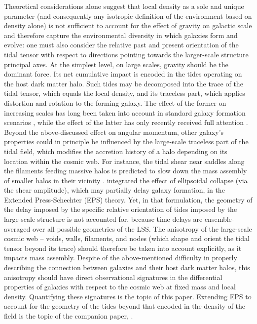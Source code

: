 \documentclass[useAMS,usenatbib]{mnras}
\begin{document}
Theoretical considerations alone suggest that local density as a sole and unique parameter (and consequently any isotropic definition of the environment based on density alone) is not sufficient to account for the effect of gravity on galactic scale \citep[e.g.][]{Mo2010} and therefore capture the environmental diversity in which galaxies form and evolve:
one must also consider the relative past and present orientation of the tidal tensor with respect to directions pointing towards the  larger-scale structure principal axes.
At the simplest level, on large scales, gravity should be the dominant force.  Its net cumulative impact is encoded in the  tides operating on the host dark matter halo. Such tides may be decomposed into the trace of the tidal tensor, which equals the local density, and its traceless part, which applies distortion and rotation to the forming galaxy. The effect of the former on increasing scales has long been taken into account in standard galaxy formation scenarios \citep{Kaiser1984}, while the effect of the latter has only recently received full attention \citep[e.g.][]{Codis2015}. 
Beyond the above-discussed effect on  angular momentum, other galaxy's properties could in principle be influenced by the large-scale traceless part of the tidal field, which modifies the accretion history of a halo depending on its location within the cosmic web. For instance, the tidal shear near saddles along the filaments feeding massive halos is predicted to slow down the mass assembly of smaller halos in their vicinity \citep[][]{Hahn2009,Borzyszkowski2016,2016arXiv161103619C}.
 \cite{BondMyers1996} integrated the effect of ellipsoidal collapse (via the shear amplitude), which may partially delay galaxy formation, in the Extended Press-Schechter (EPS) theory. Yet, in that formulation, the geometry of the delay imposed by the specific relative orientation of tides imposed by the large-scale structure is not accounted for, because time delays are ensemble-averaged over all possible geometries of the LSS. 
The  anisotropy of the large-scale cosmic web -- voids, walls, filaments, and nodes  (which shape  and orient the tidal tensor beyond its trace)
should therefore be taken into account explicitly, as it impacts mass assembly.
Despite of the above-mentioned difficulty in properly describing the connection between galaxies and their host dark matter halos, this anisotropy should have direct observational signatures in the differential properties of galaxies with respect to the cosmic web at fixed mass and local density.
Quantifying these signatures is the topic of this paper.
Extending EPS  to account for the geometry of the tides beyond that encoded in the density of the field  is the topic  of the companion paper, \cite{biaspaper}.
\end{document}
